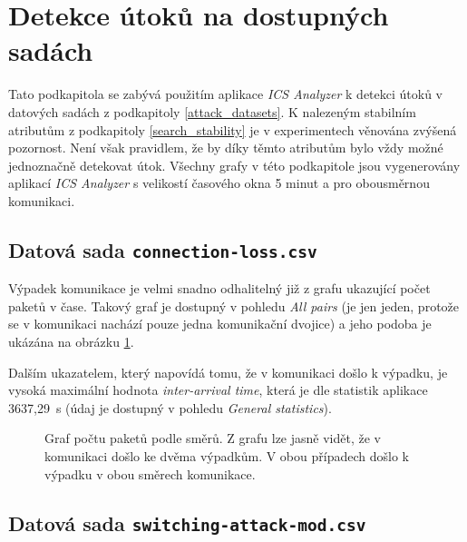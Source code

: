 \section{Detekce útoků na dostupných sadách}
\label{attack_search}


Tato podkapitola se zabývá použitím aplikace \emph{ICS Analyzer} k detekci útoků v datových sadách z podkapitoly \ref{attack_datasets}. K nalezeným stabilním atributům z podkapitoly \ref{search_stability} je v experimentech věnována zvýšená pozornost. Není však pravidlem, že by díky těmto atributům bylo vždy možné jednoznačně detekovat útok. Všechny grafy v této podkapitole jsou vygenerovány aplikací \emph{ICS Analyzer} s velikostí časového okna 5 minut a pro obousměrnou komunikaci.



\subsection*{Datová sada \texttt{connection-loss.csv}}

Výpadek komunikace je velmi snadno odhalitelný již z grafu ukazující počet paketů v čase. Takový graf je dostupný v pohledu \emph{All pairs} (je jen jeden, protože se v komunikaci nachází pouze jedna komunikační dvojice) a jeho podoba je ukázána na obrázku \ref{fig:conn_loss_attack}.

Dalším ukazatelem, který napovídá tomu, že v komunikaci došlo k výpadku, je vysoká maximální hodnota \emph{inter-arrival time}, která je dle statistik aplikace 3637,29~s (údaj je dostupný v pohledu \emph{General statistics}).


\begin{figure}[H]
	\centering
	\caption{Graf počtu paketů podle směrů. Z grafu lze jasně vidět, že v komunikaci došlo ke dvěma výpadkům. V obou případech došlo k výpadku v obou směrech komunikace.}
	\label{fig:conn_loss_attack}
\end{figure}

\subsection*{Datová sada \texttt{switching-attack-mod.csv}}


